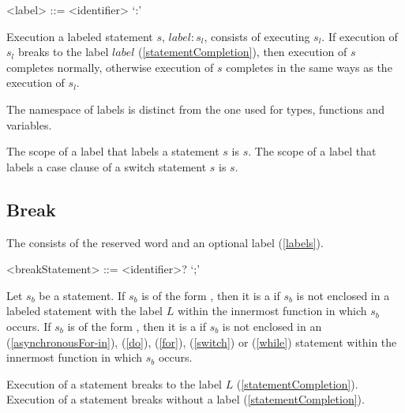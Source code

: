 \documentclass[makeidx]{article}
\begin{document}
{

\begin{grammar}
<label> ::= <identifier> `:'
\end{grammar}

\LMHash{}%
Execution a labeled statement $s$, $label: s_l$, consists of executing $s_l$.
If execution of $s_l$ breaks to the label $label$ (\ref{statementCompletion}),
then execution of $s$ completes normally,
otherwise execution of $s$ completes in the same ways as the execution of $s_l$.

\LMHash{}%
The namespace of labels is distinct from the one used for
types, functions and variables.

\LMHash{}%
The scope of a label that labels a statement $s$ is $s$.
The scope of a label that labels a case clause of a switch statement $s$ is $s$.



\subsection{Break}

\LMHash{}%
The  consists of
the reserved word \BREAK{} and an optional label (\ref{labels}).

\begin{grammar}
<breakStatement> ::= \BREAK{} <identifier>? `;'
\end{grammar}

\LMHash{}%
Let $s_b$ be a \BREAK{} statement.
If $s_b$ is of the form ,
then it is a
 if $s_b$ is not enclosed in a labeled statement
with the label $L$ within the innermost function in which $s_b$ occurs.
If $s_b$ is of the form \code{\BREAK;},
then it is a  if $s_b$ is not enclosed in an
\code{\AWAIT{} \FOR} (\ref{asynchronousFor-in}),
\DO{} (\ref{do}), \FOR{} (\ref{for}), \SWITCH{} (\ref{switch})
or \WHILE{} (\ref{while}) statement within
the innermost function in which $s_b$ occurs.

\LMHash{}%
Execution of a \BREAK{} statement  breaks to the label $L$
(\ref{statementCompletion}).
Execution of a \BREAK{} statement \code{\BREAK;} breaks without a label
(\ref{statementCompletion}).


}
\end{document}
